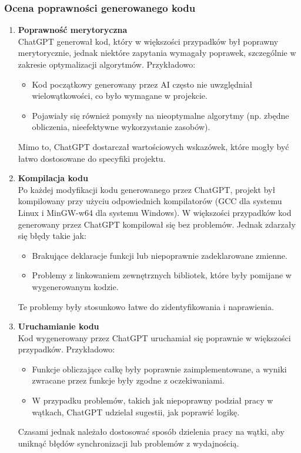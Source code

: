 \subsubsection{Ocena poprawności generowanego kodu}
\begin{enumerate}
  \item \textbf{Poprawność merytoryczna} \\
        ChatGPT generował kod, który w większości przypadków był poprawny merytorycznie, jednak niektóre zapytania wymagały poprawek, szczególnie w zakresie optymalizacji algorytmów. Przykładowo:
        \begin{itemize}
          \item Kod początkowy generowany przez AI często nie uwzględniał wielowątkowości, co było wymagane w projekcie.
          \item Pojawiały się również pomysły na nieoptymalne algorytmy (np. zbędne obliczenia, nieefektywne wykorzystanie zasobów).
        \end{itemize}
        Mimo to, ChatGPT dostarczał wartościowych wskazówek, które mogły być łatwo dostosowane do specyfiki projektu.

  \item \textbf{Kompilacja kodu} \\
        Po każdej modyfikacji kodu generowanego przez ChatGPT, projekt był kompilowany przy użyciu odpowiednich kompilatorów (GCC dla systemu Linux i MinGW-w64 dla systemu Windows). W większości przypadków kod generowany przez ChatGPT kompilował się bez problemów. Jednak zdarzały się błędy takie jak:
        \begin{itemize}
          \item Brakujące deklaracje funkcji lub niepoprawnie zadeklarowane zmienne.
          \item Problemy z linkowaniem zewnętrznych bibliotek, które były pomijane w wygenerowanym kodzie.
        \end{itemize}
        Te problemy były stosunkowo łatwe do zidentyfikowania i naprawienia.

  \item \textbf{Uruchamianie kodu} \\
        Kod wygenerowany przez ChatGPT uruchamiał się poprawnie w większości przypadków. Przykładowo:
        \begin{itemize}
          \item Funkcje obliczające całkę były poprawnie zaimplementowane, a wyniki zwracane przez funkcje były zgodne z oczekiwaniami.
          \item W przypadku problemów, takich jak niepoprawny podział pracy w wątkach, ChatGPT udzielał sugestii, jak poprawić logikę.
        \end{itemize}
        Czasami jednak należało dostosować sposób dzielenia pracy na wątki, aby uniknąć błędów synchronizacji lub problemów z wydajnością.


\end{enumerate}
